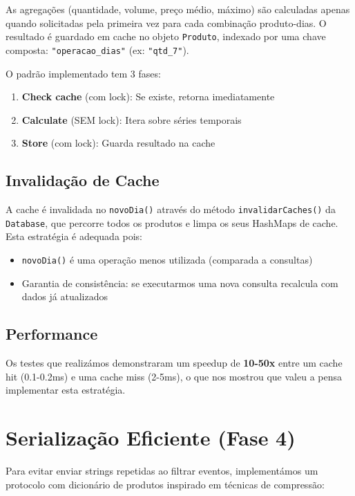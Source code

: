\documentclass[11pt,a4paper]{article}
\begin{document}
As agregações (quantidade, volume, preço médio, máximo) são calculadas apenas quando solicitadas pela primeira vez para cada combinação produto-dias. O resultado é guardado em cache no objeto \texttt{Produto}, indexado por uma chave composta: \texttt{"operacao\_dias"} (ex: \texttt{"qtd\_7"}).

O padrão implementado tem 3 fases:
\begin{enumerate}[noitemsep]
    \item \textbf{Check cache} (com lock): Se existe, retorna imediatamente
    \item \textbf{Calculate} (SEM lock): Itera sobre séries temporais
    \item \textbf{Store} (com lock): Guarda resultado na cache
\end{enumerate}

\subsection{Invalidação de Cache}

A cache é invalidada no \texttt{novoDia()} através do método \texttt{invalidarCaches()} da \texttt{Database}, que percorre todos os produtos e limpa os seus HashMaps de cache. Esta estratégia é adequada pois:
\begin{itemize}[noitemsep]
    \item \texttt{novoDia()} é uma operação menos utilizada (comparada a consultas)
    \item Garantia de consistência: se executarmos uma nova consulta recalcula com dados já atualizados
\end{itemize}

\subsection{Performance}

Os testes que realizámos demonstraram um speedup de \textbf{10-50x} entre um cache hit (0.1-0.2ms) e uma cache miss (2-5ms), o que nos mostrou que valeu a pensa implementar esta estratégia.

\section{Serialização Eficiente (Fase 4)}

Para evitar enviar strings repetidas ao filtrar eventos, implementámos um protocolo com dicionário de produtos inspirado em técnicas de compressão:
\end{document}
